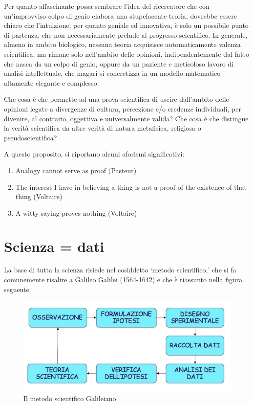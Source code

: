 \documentclass[a4paper,12pt,oneside]{book}
\providecommand{\tightlist}{%
  \setlength{\itemsep}{0pt}\setlength{\parskip}{0pt}}
\begin{document}
Per quanto affascinante possa sembrare l'idea del ricercatore che con un'improvviso colpo di genio elabora una stupefacente teoria, dovrebbe essere chiaro che l'intuizione, per quanto geniale ed innovativa, è solo un possibile punto di partenza, che non necessariamente prelude al progresso scientifico. In generale, almeno in ambito biologico, nessuna teoria acquisisce automaticamente valenza scientifica, ma rimane solo nell'ambito delle opinioni, indipendentemente dal fatto che nasca da un colpo di genio, oppure da un paziente e meticoloso lavoro di analisi intellettuale, che magari si concretizza in un modello matematico altamente elegante e complesso.

Che cosa è che permette ad una prova scientifica di uscire dall'ambito delle opinioni legate a divergenze di cultura, percezione e/o credenze individuali, per divenire, al contrario, oggettiva e universalmente valida? Che cosa è che distingue la verità scientifica da altre verità di natura metafisica, religiosa o pseudoscientifica?

A questo proposito, si riportano alcuni aforismi significativi:

\begin{enumerate}
\def\labelenumi{\arabic{enumi}.}
\tightlist
\item
  Analogy cannot serve as proof (Pasteur)
\item
  The interest I have in believing a thing is not a proof of the existence of that thing (Voltaire)
\item
  A witty saying proves nothing (Voltaire)
\end{enumerate}

\hypertarget{scienza-dati}{%
\section{Scienza = dati}\label{scienza-dati}}

La base di tutta la scienza risiede nel cosiddetto `metodo scientifico,' che si fa comunemente risalire a Galileo Galilei (1564-1642) e che è riassunto nella figura seguente.

\begin{figure}

{\centering \includegraphics[width=0.75\linewidth]{_images/MSAMap} 

}

\caption{Il metodo scientifico Galileiano}\label{fig:figName11}
\end{figure}
\end{document}
